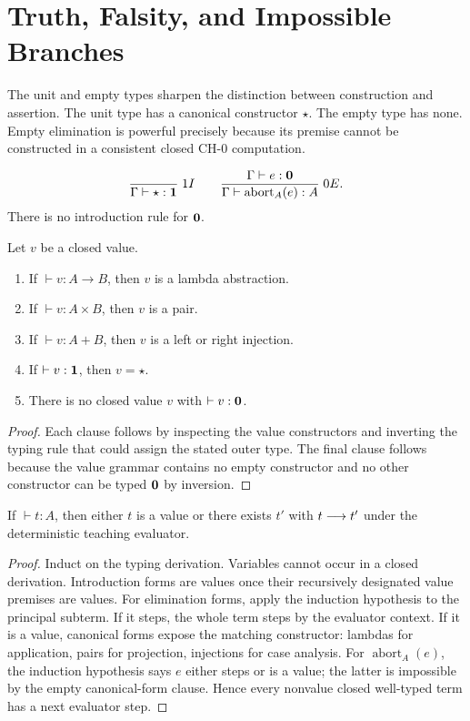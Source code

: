 \chapter{Truth, Falsity, and Impossible Branches}
\label{ch:truth-falsity}

The unit and empty types sharpen the distinction between construction and assertion. The unit type has a canonical constructor $\star$. The empty type has none. Empty elimination is powerful precisely because its premise cannot be constructed in a consistent closed $\mathrm{CH}\text{-}0$ computation.

\begin{formal}[title={Unit and empty rules}]
\[
\frac{}{\Gamma\vdash\star:\mathbf{1}}\;1I
\qquad
\frac{\Gamma\vdash e:\mathbf{0}}{\Gamma\vdash\operatorname{abort}_A(e):A}\;0E.
\]
There is no introduction rule for $\mathbf{0}$.
\end{formal}



\begin{lemma}
Let $v$ be a closed value.
\begin{enumerate}
\item If $\vdash v:A\to B$, then $v$ is a lambda abstraction.
\item If $\vdash v:A\times B$, then $v$ is a pair.
\item If $\vdash v:A+B$, then $v$ is a left or right injection.
\item If $\vdash v:\mathbf{1}$, then $v=\star$.
\item There is no closed value $v$ with $\vdash v:\mathbf{0}$.
\end{enumerate}
\end{lemma}
\begin{proof}
Each clause follows by inspecting the value constructors and inverting the typing rule that could assign the stated outer type. The final clause follows because the value grammar contains no empty constructor and no other constructor can be typed $\mathbf{0}$ by inversion.
\end{proof}



\begin{theorem}
If $\vdash t:A$, then either $t$ is a value or there exists $t'$ with $t\mathrel{\longrightarrow} t'$ under the deterministic teaching evaluator.
\end{theorem}
\begin{proof}
Induct on the typing derivation. Variables cannot occur in a closed derivation. Introduction forms are values once their recursively designated value premises are values. For elimination forms, apply the induction hypothesis to the principal subterm. If it steps, the whole term steps by the evaluator context. If it is a value, canonical forms expose the matching constructor: lambdas for application, pairs for projection, injections for case analysis. For $\operatorname{abort}_A(e)$, the induction hypothesis says $e$ either steps or is a value; the latter is impossible by the empty canonical-form clause. Hence every nonvalue closed well-typed term has a next evaluator step.
\end{proof}

